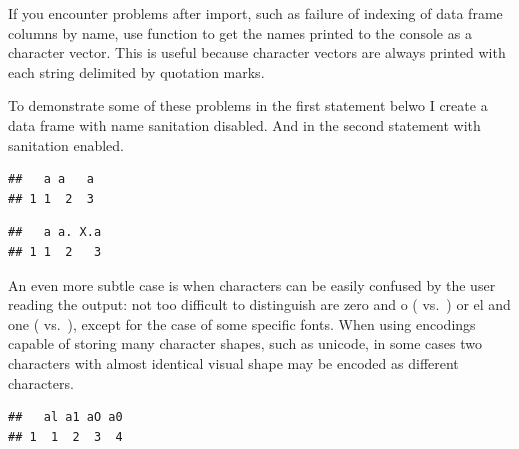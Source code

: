 \documentclass[krantz2]{krantz}\usepackage{knitr}%
\begin{document}
\begin{warningbox}
If you encounter problems after import, such as failure of indexing of data frame columns by name, use function  to get the names printed to the console as a character vector. This is useful because character vectors are always printed with each string delimited by quotation marks.

To demonstrate some of these problems in the first statement belwo I create a data frame with name sanitation disabled. And in the second statement with sanitation enabled.
\begin{knitrout}\footnotesize
{}\color{fgcolor}\begin{kframe}
\begin{alltt}
\hlstd{(} \hlstd{=} \hlstd{,}  \hlstd{=} \hlstd{,}  \hlstd{=} \hlstd{,}  \hlstd{=} \hlstd{)}
\end{alltt}
\begin{verbatim}
##   a a   a
## 1 1  2  3
\end{verbatim}
\begin{alltt}
\hlstd{(} \hlstd{=} \hlstd{,}  \hlstd{=} \hlstd{,}  \hlstd{=} \hlstd{)}
\end{alltt}
\begin{verbatim}
##   a a. X.a
## 1 1  2   3
\end{verbatim}
\end{kframe}
\end{knitrout}

An even more subtle case is when characters can be easily confused by the user reading the output: not too difficult to distinguish are zero and o ( vs.\ ) or el and one ( vs.\ ), except for the case of some specific fonts. When using encodings capable of storing many character shapes, such as unicode, in some cases two characters with almost identical visual shape may be encoded as different characters.

\begin{knitrout}\footnotesize
{}\color{fgcolor}\begin{kframe}
\begin{alltt}
\hlstd{(} \hlstd{=} \hlstd{,}  \hlstd{=} \hlstd{,}  \hlstd{=} \hlstd{,}  \hlstd{=} \hlstd{)}
\end{alltt}
\begin{verbatim}
##   al a1 aO a0
## 1  1  2  3  4
\end{verbatim}
\end{kframe}
\end{knitrout}


\end{warningbox}
\end{document}
